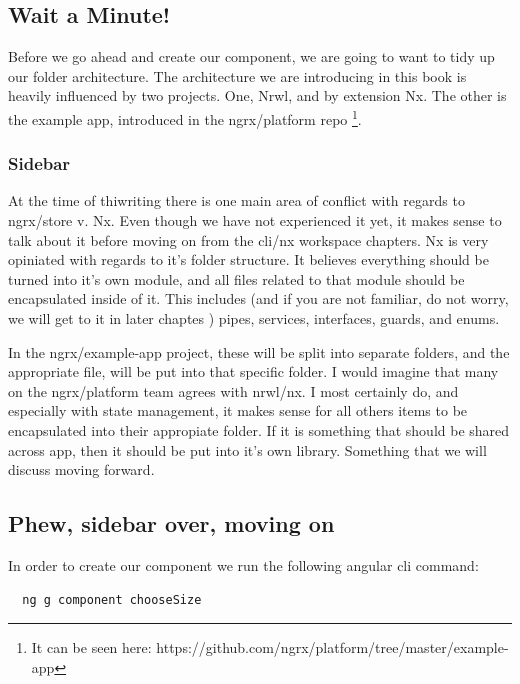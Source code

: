\subsection {Wait a Minute!}
Before we go ahead and create our component, we are going to want to tidy up
our folder architecture. The architecture we are introducing in this book is
heavily influenced by two projects. One, Nrwl, and by extension Nx. The other is
the example app, introduced in the ngrx/platform repo \footnote{It can be seen
here: https://github.com/ngrx/platform/tree/master/example-app}.

\subsubsection {Sidebar}
At the time of thiwriting there is one main area of conflict with regards to
ngrx/store v. Nx. Even though we have not experienced it yet, it makes sense to
talk about it before moving on from the cli/nx workspace chapters. Nx is very
opiniated with regards to it's folder structure. It believes everything should
be turned into it's own module, and all files related to that module should
be encapsulated inside of it. This includes (and if you are not familiar, do not
worry, we will get to it in later chaptes ) pipes, services, interfaces, guards,
and enums.

In the ngrx/example-app project, these will be split into separate folders, and
the appropriate file, will be put into that specific folder. I would imagine
that many on the ngrx/platform team agrees with nrwl/nx. I most certainly do,
and especially with state management, it makes sense for all others items to
be encapsulated into their appropiate folder. If it is something that should be
shared across app, then it should be put into it's own library. Something that
we will discuss moving forward.

\subsection {Phew, sidebar over, moving on}

In order to create our component we run the following angular cli command:

\begin{verbatim}
  ng g component chooseSize
\end{verbatim}
